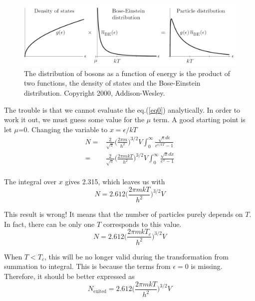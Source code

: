\begin{figure}[h]
\centering
\includegraphics[width=0.9\linewidth]{imgs/BEC1.png}
\caption{The distribution of bosons as a function of energy is the product of
two functions, the density of states and the Bose-Einstein distribution. Copyright 2000, Addison-Wesley. }
\end{figure}

The trouble is that we cannot evaluate the eq.(\ref{eq0}) analytically. In order to work it out, we must guess some value for the $\mu$ term. A good starting point is let $\mu$=0. Changing the variable to $x = \epsilon/kT$
\begin{equation}
\begin{split}
    N = & \frac{2}{\sqrt{\pi}}\bigg(\frac{2\pi m}{h^2}\bigg)^{3/2}V \int_0^{\infty} \frac{\sqrt{\epsilon} d\epsilon}{e^{\epsilon/kT}-1}\\
      = & \frac{2}{\sqrt{\pi}}\bigg(\frac{2\pi mkT}{h^2}\bigg)^{3/2}V \int_{0}^{\infty} \frac{\sqrt{x} dx}{e^x-1}\\
\end{split}
\end{equation}

The integral over $x$ gives 2.315, which leaves us with
\begin{equation}
N = 2.612\bigg(\frac{2\pi mkT}{h^2}\bigg)^{3/2}V
\end{equation}

This result is wrong! It means that the number of particles purely depends on $T$. In fact, there can be only one $T$ corresponds to this value.
\begin{equation}
    N = 2.612\bigg(\frac{2\pi m kT_c}{h^2}\bigg)^{3/2}V
\end{equation}

When $T<T_c$, this will be no longer valid during the transformation from summation to integral. This is because the terms from $\epsilon =0$ is missing. Therefore, it should be better expressed as
\begin{equation}
    N_\textrm{exited} = 2.612\bigg(\frac{2\pi mkT}{h^2}\bigg)^{3/2}V
\end{equation}

